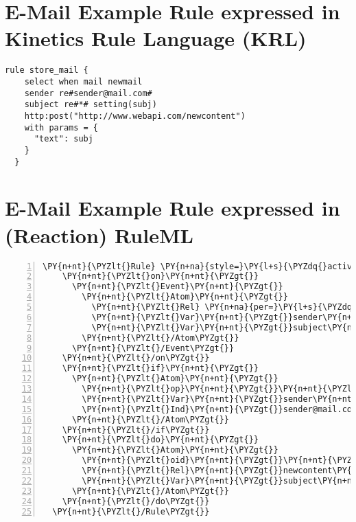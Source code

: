 \section{E-Mail Example Rule expressed in Kinetics Rule Language (KRL)}
\label{lst:MailKRL}
\begin{lstlisting}[nolol,float=h,label=lstkre,language=KRE,caption=E-Mail Example rule in KRL]
  rule store_mail {
    select when mail newmail
    sender re#sender@mail.com#
    subject re#*# setting(subj)
    http:post("http://www.webapi.com/newcontent")
    with params = {
      "text": subj
    }
  }
\end{lstlisting}


\section{E-Mail Example Rule expressed in (Reaction) RuleML}
\label{lst:MailRuleML}
\begin{Verbatim}[frame=single,fontsize=\footnotesize,commandchars=\\\{\},numbers=left,firstnumber=1,stepnumber=1,xleftmargin
=.3in]
  \PY{n+nt}{\PYZlt{}Rule} \PY{n+na}{style=}\PY{l+s}{\PYZdq{}active\PYZdq{}}\PY{n+nt}{\PYZgt{}}
    \PY{n+nt}{\PYZlt{}on}\PY{n+nt}{\PYZgt{}}
      \PY{n+nt}{\PYZlt{}Event}\PY{n+nt}{\PYZgt{}}
        \PY{n+nt}{\PYZlt{}Atom}\PY{n+nt}{\PYZgt{}}
          \PY{n+nt}{\PYZlt{}Rel} \PY{n+na}{per=}\PY{l+s}{\PYZdq{}value\PYZdq{}}\PY{n+nt}{\PYZgt{}}mail\PY{n+nt}{\PYZlt{}/Rel\PYZgt{}}
          \PY{n+nt}{\PYZlt{}Var}\PY{n+nt}{\PYZgt{}}sender\PY{n+nt}{\PYZlt{}/Var\PYZgt{}}
          \PY{n+nt}{\PYZlt{}Var}\PY{n+nt}{\PYZgt{}}subject\PY{n+nt}{\PYZlt{}/Var\PYZgt{}}
        \PY{n+nt}{\PYZlt{}/Atom\PYZgt{}}
      \PY{n+nt}{\PYZlt{}/Event\PYZgt{}}
    \PY{n+nt}{\PYZlt{}/on\PYZgt{}}
    \PY{n+nt}{\PYZlt{}if}\PY{n+nt}{\PYZgt{}}
      \PY{n+nt}{\PYZlt{}Atom}\PY{n+nt}{\PYZgt{}}
        \PY{n+nt}{\PYZlt{}op}\PY{n+nt}{\PYZgt{}}\PY{n+nt}{\PYZlt{}Rel}\PY{n+nt}{\PYZgt{}}equals\PY{n+nt}{\PYZlt{}/Rel\PYZgt{}}\PY{n+nt}{\PYZlt{}/op\PYZgt{}}
        \PY{n+nt}{\PYZlt{}Var}\PY{n+nt}{\PYZgt{}}sender\PY{n+nt}{\PYZlt{}/Var\PYZgt{}}
        \PY{n+nt}{\PYZlt{}Ind}\PY{n+nt}{\PYZgt{}}sender@mail.com\PY{n+nt}{\PYZlt{}/Ind\PYZgt{}}
      \PY{n+nt}{\PYZlt{}/Atom\PYZgt{}}
    \PY{n+nt}{\PYZlt{}/if\PYZgt{}}
    \PY{n+nt}{\PYZlt{}do}\PY{n+nt}{\PYZgt{}}
      \PY{n+nt}{\PYZlt{}Atom}\PY{n+nt}{\PYZgt{}}
        \PY{n+nt}{\PYZlt{}oid}\PY{n+nt}{\PYZgt{}}\PY{n+nt}{\PYZlt{}Ind} \PY{n+na}{uri=}\PY{l+s}{\PYZdq{}http://webapi.com\PYZdq{}}\PY{n+nt}{/\PYZgt{}}\PY{n+nt}{\PYZlt{}/oid\PYZgt{}}
        \PY{n+nt}{\PYZlt{}Rel}\PY{n+nt}{\PYZgt{}}newcontent\PY{n+nt}{\PYZlt{}/Rel\PYZgt{}}
        \PY{n+nt}{\PYZlt{}Var}\PY{n+nt}{\PYZgt{}}subject\PY{n+nt}{\PYZlt{}/Var\PYZgt{}} 
      \PY{n+nt}{\PYZlt{}/Atom\PYZgt{}}
    \PY{n+nt}{\PYZlt{}/do\PYZgt{}}
  \PY{n+nt}{\PYZlt{}/Rule\PYZgt{}}
\end{Verbatim}


